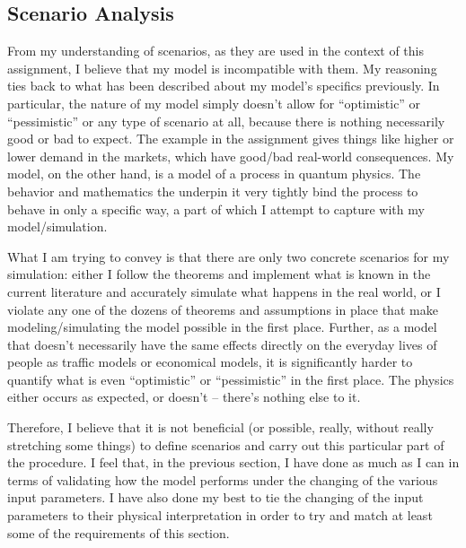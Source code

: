 \subsection{Scenario Analysis}

From my understanding of scenarios, as they are used in the context of this assignment, I believe that my model is incompatible with them. My reasoning ties back to what has been described about my model's specifics previously. In particular, the nature of my model simply doesn't allow for ``optimistic'' or ``pessimistic'' or any type of scenario at all, because there is nothing necessarily good or bad to expect. The example in the assignment gives things like higher or lower demand in the markets, which have good/bad real-world consequences. My model, on the other hand, is a model of a process in quantum physics. The behavior and mathematics the underpin it very tightly bind the process to behave in only a specific way, a part of which I attempt to capture with my model/simulation.

What I am trying to convey is that there are only two concrete scenarios for my simulation: either I follow the theorems and implement what is known in the current literature and accurately simulate what happens in the real world, or I violate any one of the dozens of theorems and assumptions in place that make modeling/simulating the model possible in the first place. Further, as a model that doesn't necessarily have the same effects directly on the everyday lives of people as traffic models or economical models, it is significantly harder to quantify what is even ``optimistic'' or ``pessimistic'' in the first place. The physics either occurs as expected, or doesn't -- there's nothing else to it.

Therefore, I believe that it is not beneficial (or possible, really, without really stretching some things) to define scenarios and carry out this particular part of the procedure. I feel that, in the previous section, I have done as much as I can in terms of validating how the model performs under the changing of the various input parameters. I have also done my best to tie the changing of the input parameters to their physical interpretation in order to try and match at least some of the requirements of this section.




